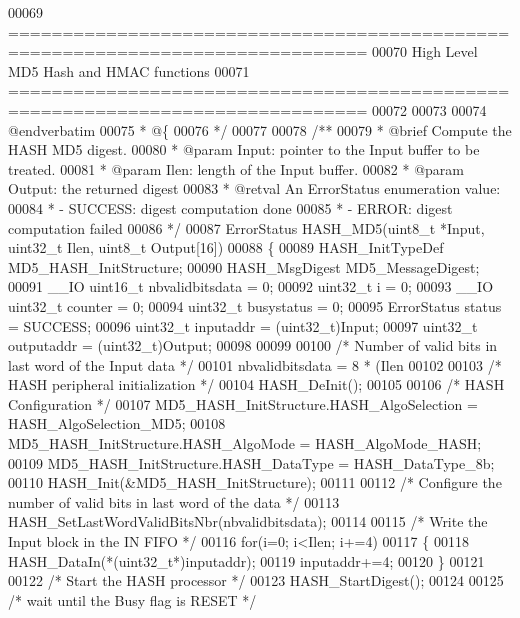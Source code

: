 \begin{DoxyCode}
00069 \textcolor{comment}{ ===============================================================================}
00070 \textcolor{comment}{                          High Level MD5 Hash and HMAC functions}
00071 \textcolor{comment}{ ===============================================================================}
00072 \textcolor{comment}{}
00073 \textcolor{comment}{}
00074 \textcolor{comment}{@endverbatim}
00075 \textcolor{comment}{  * @\{}
00076 \textcolor{comment}{  */}
00077 
00078 \textcolor{comment}{/**}
00079 \textcolor{comment}{  * @brief  Compute the HASH MD5 digest.}
00080 \textcolor{comment}{  * @param  Input: pointer to the Input buffer to be treated.}
00081 \textcolor{comment}{  * @param  Ilen: length of the Input buffer.}
00082 \textcolor{comment}{  * @param  Output: the returned digest}
00083 \textcolor{comment}{  * @retval An ErrorStatus enumeration value:}
00084 \textcolor{comment}{  *          - SUCCESS: digest computation done}
00085 \textcolor{comment}{  *          - ERROR: digest computation failed}
00086 \textcolor{comment}{  */}
00087 ErrorStatus HASH_MD5(uint8\_t *Input, uint32\_t Ilen, uint8\_t Output[16])
00088 \{
00089   HASH\_InitTypeDef MD5\_HASH\_InitStructure;
00090   HASH\_MsgDigest MD5\_MessageDigest;
00091   \_\_IO uint16\_t nbvalidbitsdata = 0;
00092   uint32\_t i = 0;
00093   \_\_IO uint32\_t counter = 0;
00094   uint32\_t busystatus = 0;
00095   ErrorStatus status = SUCCESS;
00096   uint32\_t inputaddr  = (uint32\_t)Input;
00097   uint32\_t outputaddr = (uint32\_t)Output;
00098 
00099 
00100   \textcolor{comment}{/* Number of valid bits in last word of the Input data */}
00101   nbvalidbitsdata = 8 * (Ilen %
00102 
00103   \textcolor{comment}{/* HASH peripheral initialization */}
00104   HASH_DeInit();
00105 
00106   \textcolor{comment}{/* HASH Configuration */}
00107   MD5\_HASH\_InitStructure.HASH\_AlgoSelection = HASH_AlgoSelection_MD5;
00108   MD5\_HASH\_InitStructure.HASH\_AlgoMode = HASH_AlgoMode_HASH;
00109   MD5\_HASH\_InitStructure.HASH\_DataType = HASH_DataType_8b;
00110   HASH_Init(&MD5\_HASH\_InitStructure);
00111 
00112   \textcolor{comment}{/* Configure the number of valid bits in last word of the data */}
00113   HASH\_SetLastWordValidBitsNbr(nbvalidbitsdata);
00114 
00115   \textcolor{comment}{/* Write the Input block in the IN FIFO */}
00116   \textcolor{keywordflow}{for}(i=0; i<Ilen; i+=4)
00117   \{
00118     HASH\_DataIn(*(uint32\_t*)inputaddr);
00119     inputaddr+=4;
00120   \}
00121 
00122   \textcolor{comment}{/* Start the HASH processor */}
00123   HASH_StartDigest();
00124 
00125   \textcolor{comment}{/* wait until the Busy flag is RESET */}

\end{DoxyCode}
